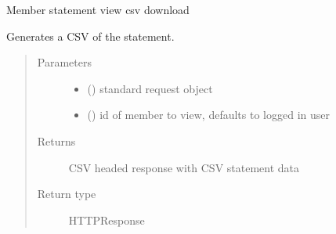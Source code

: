 \documentclass[letterpaper,10pt,english]{sphinxmanual}
\begin{document}
\begin{fulllineitems}
\label{\detokenize{payments:payments.views.statement_csv}}
Member statement view \sphinxhyphen{} csv download

Generates a CSV of the statement.
\begin{quote}\begin{description}
\item[{Parameters}] \leavevmode\begin{itemize}
\item {} 
 () \textendash{} standard request object

\item {} 
 () \textendash{} id of member to view, defaults to logged in user

\end{itemize}

\item[{Returns}] \leavevmode
CSV headed response with CSV statement data

\item[{Return type}] \leavevmode
HTTPResponse

\end{description}\end{quote}

\end{fulllineitems}

\end{document}
